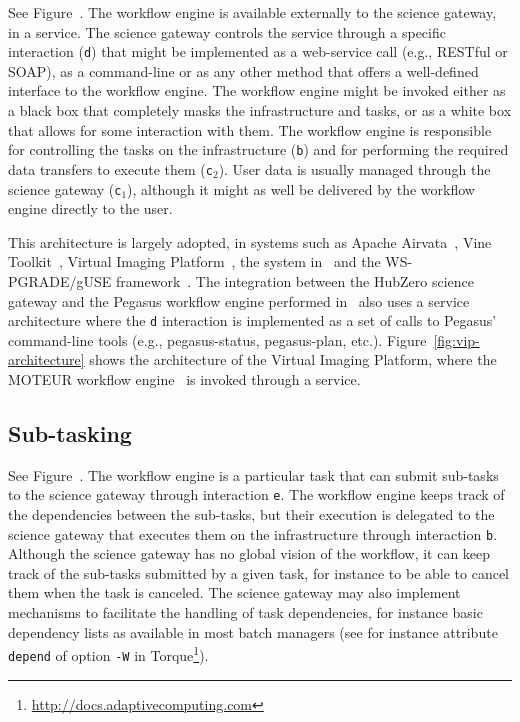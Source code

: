 \documentclass[preprint,3p,twocolumn]{elsarticle}
\begin{document}
See Figure~. The workflow engine is available
externally to the science gateway, in a service. The science gateway
controls the service through a specific interaction (\texttt{d}) that
might be implemented as a web-service call (e.g., RESTful or SOAP), as
a command-line or as any other method that offers a well-defined
interface to the workflow engine. The workflow engine might be invoked
either as a black box that completely masks the infrastructure and
tasks, or as a white box that allows for some interaction with
them. The workflow engine is responsible for controlling the tasks on
the infrastructure (\texttt{b}) and for performing the required data
transfers to execute them (\texttt{c$_2$}). User data is usually
managed through the science gateway (\texttt{c$_1$}), although it
might as well be delivered by the workflow engine directly to the
user.

This architecture is largely adopted, in systems such as Apache
Airvata~\cite{marru2011apache}, Vine
Toolkit~\cite{DBLP:journals/scpe/SzejnfeldDKKKKLPTWDNW10}, Virtual
Imaging Platform~\cite{GLAT-13}, the system
in~\cite{wu2010accelerating} and the WS-PGRADE/gUSE
framework~\cite{Kacsuk2012}. The integration between the
HubZero science gateway and the Pegasus workflow engine performed
in~\cite{CPE:CPE3257} also uses a service architecture where the
\texttt{d} interaction is implemented as a set of calls to Pegasus'
command-line tools (e.g., pegasus-status, pegasus-plan,
etc.). Figure~\ref{fig:vip-architecture} shows the architecture of the
Virtual Imaging Platform, where the MOTEUR workflow
engine~\cite{GLAT-08i} is invoked through a service.

\subsection{Sub-tasking}

See Figure~. The workflow engine is a particular
task that can submit sub-tasks to the science gateway through
interaction \texttt{e}. The workflow engine keeps track of the
dependencies between the sub-tasks, but their execution is delegated to
the science gateway that executes them on the infrastructure through
interaction \texttt{b}. Although the science gateway has no global
vision of the workflow, it can keep track of the sub-tasks submitted
by a given task, for instance to be able to cancel them when the task
is canceled. The science gateway may also implement mechanisms to
facilitate the handling of task dependencies, for instance basic
dependency lists as available in most batch managers (see for instance
attribute \texttt{depend} of option \texttt{-W} in
Torque\footnote{\url{http://docs.adaptivecomputing.com}}).
\end{document}
